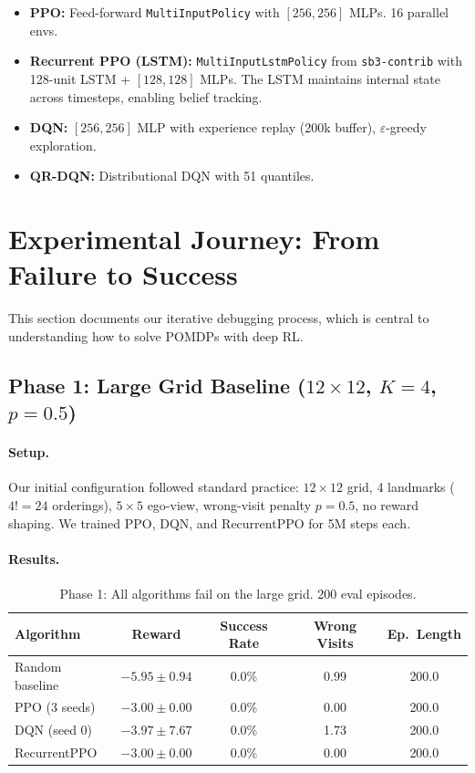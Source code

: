 \documentclass[11pt,a4paper]{article}
\begin{document}
\begin{itemize}[nosep]
  \item \textbf{PPO:} Feed-forward \texttt{MultiInputPolicy} with $[256,256]$ MLPs. 16 parallel envs.
  \item \textbf{Recurrent PPO (LSTM):} \texttt{MultiInputLstmPolicy} from \texttt{sb3-contrib} with 128-unit LSTM + $[128,128]$ MLPs. The LSTM maintains internal state across timesteps, enabling belief tracking.
  \item \textbf{DQN:} $[256,256]$ MLP with experience replay (200k buffer), $\varepsilon$-greedy exploration.
  \item \textbf{QR-DQN:} Distributional DQN with 51 quantiles.
\end{itemize}

\section{Experimental Journey: From Failure to Success}

This section documents our iterative debugging process, which is central to
understanding how to solve POMDPs with deep RL.

\subsection{Phase 1: Large Grid Baseline ($12\times12$, $K\!=\!4$, $p\!=\!0.5$)}

\paragraph{Setup.} Our initial configuration followed standard practice:
$12\times12$ grid, 4 landmarks ($4!=24$ orderings), $5\times5$ ego-view,
wrong-visit penalty $p=0.5$, no reward shaping. We trained PPO, DQN, and
RecurrentPPO for 5M steps each.

\paragraph{Results.}

\begin{table}[H]
\centering
\begin{tabular}{lcccc}
\toprule
\textbf{Algorithm} & \textbf{Reward} & \textbf{Success Rate}
  & \textbf{Wrong Visits} & \textbf{Ep.\ Length} \\
\midrule
Random baseline    & $-5.95 \pm 0.94$  & 0.0\%  & 0.99  & 200.0 \\
PPO (3 seeds)      & $-3.00 \pm 0.00$  & 0.0\%  & 0.00  & 200.0 \\
DQN (seed 0)       & $-3.97 \pm 7.67$  & 0.0\%  & 1.73  & 200.0 \\
RecurrentPPO       & $-3.00 \pm 0.00$  & 0.0\%  & 0.00  & 200.0 \\
\bottomrule
\end{tabular}
\caption{Phase 1: All algorithms fail on the large grid. 200 eval episodes.}
\label{tab:phase1}
\end{table}
\end{document}
